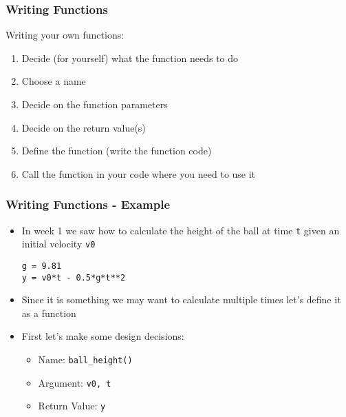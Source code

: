 \documentclass[english,14pt]{beamer}
\begin{document}
\begin{frame}
\frametitle{Writing Functions}
Writing your own functions:
	\begin{enumerate}
		\item Decide (for yourself) what the function needs to do
		 
		\item Choose a name
		 
		\item Decide on the function parameters
		 
		\item Decide on the return value(s)
		 
		\item Define the function (write the function code)
		\item Call the function in your code where you need to use it	
	\end{enumerate}
\end{frame}

\begin{frame}[fragile]
\frametitle{Writing Functions - Example}
    \begin{itemize}
        \item In week 1 we saw how to calculate the height of the ball at time \texttt{t} given an initial velocity \texttt{v0}
\begin{lstlisting}[style=CStyle]
g = 9.81                     
y = v0*t - 0.5*g*t**2
\end{lstlisting}
        \item Since it is something we may want to calculate multiple times let's define it as a function 
        \item First let's make some design decisions:
	    \begin{itemize}%
		    \item Name: \texttt{ball\_height()}
		    \item Argument: \texttt{v0, t}
		    \item Return Value: \texttt{y} 
	    \end{itemize}
   \end{itemize}
\end{frame}
	
\end{document}
